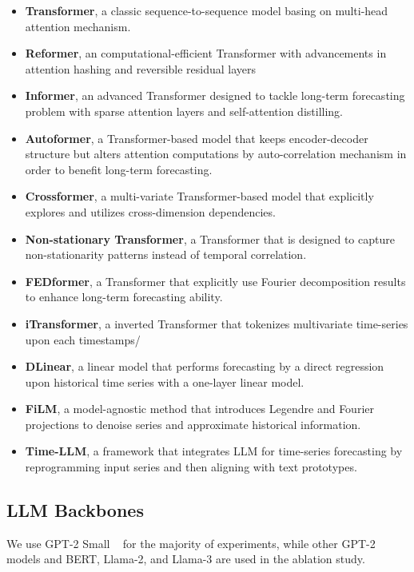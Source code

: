 \begin{itemize}
    \item \textbf{Transformer}, a classic sequence-to-sequence model basing on multi-head attention mechanism.
    \item \textbf{Reformer}, an computational-efficient Transformer with advancements in attention hashing and reversible residual layers
    \item \textbf{Informer}, an advanced Transformer designed to tackle long-term forecasting problem with sparse attention layers and self-attention distilling.
    \item \textbf{Autoformer}, a Transformer-based model that keeps encoder-decoder structure but alters attention computations by auto-correlation mechanism in order to benefit long-term forecasting.
    \item \textbf{Crossformer}, a multi-variate Transformer-based model that explicitly explores and utilizes cross-dimension dependencies. 
    \item \textbf{Non-stationary Transformer}, a Transformer that is designed to capture non-stationarity patterns instead of temporal correlation.
    \item \textbf{FEDformer}, a Transformer that explicitly use Fourier decomposition results to enhance long-term forecasting ability.
    \item \textbf{iTransformer}, a inverted Transformer that tokenizes multivariate time-series upon each timestamps/
    \item \textbf{DLinear}, a linear model that performs forecasting by a direct regression upon historical time series with a one-layer linear model.
    \item \textbf{FiLM}, a model-agnostic method that introduces Legendre and Fourier projections to denoise series and approximate historical information.
    \item \textbf{Time-LLM}, a framework that integrates LLM for time-series forecasting by reprogramming input series and then aligning with text prototypes.
\end{itemize}

\subsection{LLM Backbones}

We use GPT-2 Small ~\cite{radford2019language} for the majority of experiments, while other GPT-2 models and BERT, Llama-2, and Llama-3 are used in the ablation study.

